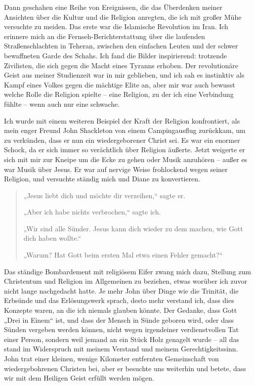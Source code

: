 \documentclass[12pt]{memoir}
\begin{document}
Dann geschahen eine Reihe von Ereignissen,
die das Überdenken meiner Ansichten über die Kultur und die Religion anregten,
die ich mit großer Mühe versuchte zu meiden.
Das erste war die Islamische Revolution im Iran.
Ich erinnere mich an die Fernseh-Berichterstattung
über die laufenden Straßenschlachten in Teheran,
zwischen den einfachen Leuten und der schwer bewaffneten Garde des Schahs.
Ich fand die Bilder inspirierend:
trotzende Zivilisten, die sich gegen die Macht eines Tyranns erhoben.
Der revolutionäre Geist aus meiner Studienzeit war in mir geblieben,
und ich sah es instinktiv als Kampf eines Volkes gegen die mächtige Elite an,
aber mir war auch bewusst welche Rolle die Religion spielte – eine Religion,
zu der ich eine Verbindung fühlte – wenn auch nur eine schwache.

Ich wurde mit einem weiteren Beispiel der Kraft der Religion konfrontiert,
als mein enger Freund John Shackleton von einem Campingausflug zurückkam,
um zu verkünden, dass er nun ein wiedergeborener Christ sei.
Es war ein enormer Schock,
da er sich immer so verächtlich über Religion äußerte.
Jetzt weigerte er sich mit mir zur Kneipe um die Ecke zu gehen
oder Musik anzuhören – außer es war Musik über Jesus.
Er war auf nervige Weise frohlockend wegen seiner Religion,
und versuchte ständig mich und Diane zu konvertieren.

\begin{quote}
„Jesus liebt dich und möchte dir verzeihen,“ sagte er.

„Aber ich habe nichts verbrochen,“ sagte ich.

„Wir sind alle Sünder.
Jesus kann dich wieder zu dem machen, wie Gott dich haben wollte.“

„Warum? Hat Gott beim ersten Mal etwa einen Fehler gemacht?“
\end{quote}

Das ständige Bombardement mit religiösem Eifer zwang mich dazu,
Stellung zum Christentum und Religion im Allgemeinen zu beziehen,
etwas worüber ich zuvor nicht lange nachgedacht hatte.
Je mehr John über Dinge wie die Trinität,
die Erbsünde und das Erlösungswerk sprach, desto mehr verstand ich,
dass dies Konzepte waren, an die ich niemals glauben könnte.
Der Gedanke, dass Gott „Drei in Einem“ ist,
und dass der Mensch in Sünde geboren wird,
oder dass Sünden vergeben werden können,
nicht wegen irgendeiner verdienstvollen Tat einer Person,
sondern weil jemand an ein Stück Holz genagelt wurde –
all das stand im Widerspruch mit meinem Verstand und meinem Gerechtigkeitssinn.
John trat einer kleinen,
wenige Kilometer entfernten Gemeinschaft von wiedergebohrenen Christen bei,
aber er besuchte uns weiterhin und betete,
dass wir mit dem Heiligen Geist erfüllt werden mögen.
\end{document}
